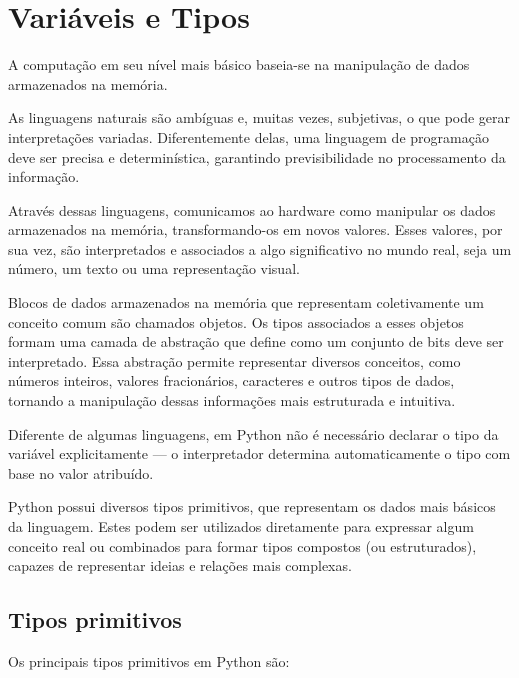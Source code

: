 \chapter{Variáveis e Tipos}

A computação em seu nível mais básico baseia-se na manipulação de dados armazenados na memória.

As linguagens naturais são ambíguas e, muitas vezes, subjetivas, o que pode gerar interpretações variadas.
Diferentemente delas, uma linguagem de programação deve ser precisa e determinística, garantindo previsibilidade no
processamento da informação.

Através dessas linguagens, comunicamos ao hardware como manipular os dados armazenados na memória, transformando-os
em novos valores.
Esses valores, por sua vez, são interpretados e associados a algo significativo no mundo real, seja um número, um
texto ou uma representação visual.

Blocos de dados armazenados na memória que representam coletivamente um conceito comum são chamados objetos.
Os tipos associados a esses objetos formam uma camada de abstração que define como um conjunto de bits deve ser
interpretado.
Essa abstração permite representar diversos conceitos, como números inteiros, valores fracionários, caracteres e outros
tipos de dados, tornando a manipulação dessas informações mais estruturada e intuitiva.

Diferente de algumas linguagens, em Python não é necessário declarar o tipo da variável explicitamente
--- o interpretador determina automaticamente o tipo com base no valor atribuído.

Python possui diversos tipos primitivos, que representam os dados mais básicos da linguagem.
Estes podem ser utilizados diretamente para expressar algum conceito real ou combinados para formar tipos compostos
(ou estruturados), capazes de representar ideias e relações mais complexas.


\section{Tipos primitivos}

Os principais tipos primitivos em Python são:

